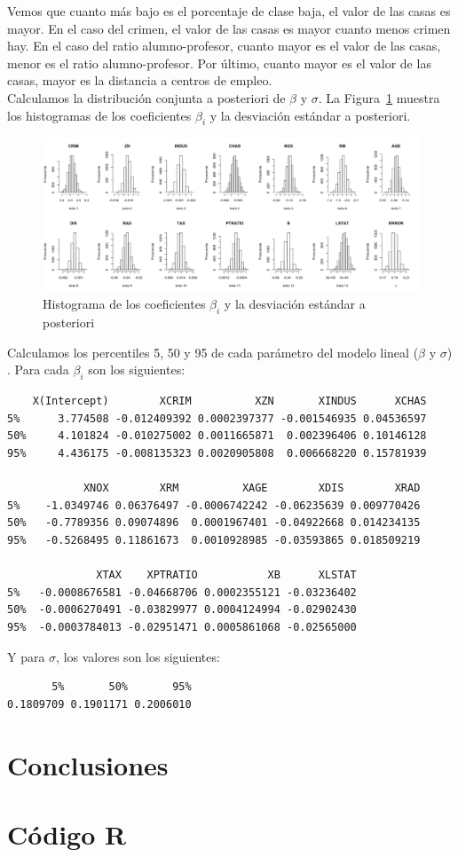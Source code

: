 \documentclass[12pt,a4paper,twoside,openright,titlepage,final]{article}
\begin{document}
Vemos que cuanto más bajo es el porcentaje de clase baja, el valor de las casas es mayor. En el caso del crimen, el valor de las casas es mayor cuanto menos crimen hay. En el caso del ratio alumno-profesor, cuanto mayor es el valor de las casas, menor es el ratio alumno-profesor. Por último, cuanto mayor es el valor de las casas, mayor es la distancia a centros de empleo.\\

Calculamos la distribución conjunta a posteriori de $\beta$ y $\sigma$. La Figura~\ref{fig:histograma_beta} muestra los histogramas de los coeficientes $\beta_i$ y la desviación estándar a posteriori.

\begin{figure}[tbph!]
\centering
\includegraphics[width=0.9\linewidth]{imagenes/histograma_beta}
\caption{Histograma de los coeficientes $\beta_i$ y la desviación estándar a posteriori}
\label{fig:histograma_beta}
\end{figure}

Calculamos los percentiles 5, 50 y 95 de cada parámetro del modelo lineal ($\beta$ y $\sigma$) . Para cada $\beta_i$ son los siguientes:

\begin{verbatim}
    X(Intercept)        XCRIM          XZN       XINDUS      XCHAS
5%      3.774508 -0.012409392 0.0002397377 -0.001546935 0.04536597
50%     4.101824 -0.010275002 0.0011665871  0.002396406 0.10146128
95%     4.436175 -0.008135323 0.0020905808  0.006668220 0.15781939

            XNOX        XRM          XAGE        XDIS        XRAD    
5%    -1.0349746 0.06376497 -0.0006742242 -0.06235639 0.009770426 
50%   -0.7789356 0.09074896  0.0001967401 -0.04922668 0.014234135
95%   -0.5268495 0.11861673  0.0010928985 -0.03593865 0.018509219

              XTAX    XPTRATIO           XB      XLSTAT
5%   -0.0008676581 -0.04668706 0.0002355121 -0.03236402
50%  -0.0006270491 -0.03829977 0.0004124994 -0.02902430
95%  -0.0003784013 -0.02951471 0.0005861068 -0.02565000
\end{verbatim}

Y para $\sigma$, los valores son los siguientes:

\begin{verbatim}
       5%       50%       95% 
0.1809709 0.1901171 0.2006010 
\end{verbatim}

\section{Conclusiones}

\newpage

\section{Código R}

%
\end{document}
